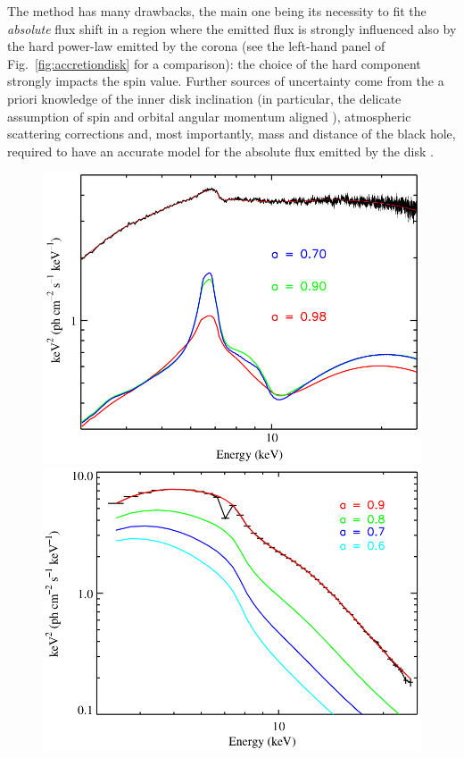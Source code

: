 \documentclass[a4paper,titlepage]{book}     	%
\begin{document}
The method has many drawbacks, the main one being its necessity to fit the \textit{absolute} flux shift in a region where the emitted flux is strongly influenced also by the hard power-law emitted by the corona (see the left-hand panel of Fig.\ \ref{fig:accretiondisk} for a comparison): the choice of the hard component strongly impacts the spin value. Further sources of uncertainty come from the a priori knowledge of the inner disk inclination (in particular, the delicate assumption of spin and orbital angular momentum aligned \cite{BHspinmisaligned_2022}), atmospheric scattering corrections and, most importantly, mass and distance of the black hole, required to have an accurate model for the absolute flux emitted by the disk \cite{Xbinaries_spinBHmeasure}.


\begin{figure}
	\begin{minipage}{.48\textwidth}
		\centering
		\includegraphics[width=\textwidth]{./images/spinreflection.png}
	\end{minipage}
	\hfill
	\begin{minipage}{.49\textwidth}
		\centering
		\includegraphics[width=\textwidth]{./images/spincontinuum.png}	

\end{minipage}
\end{figure}
\end{document}
